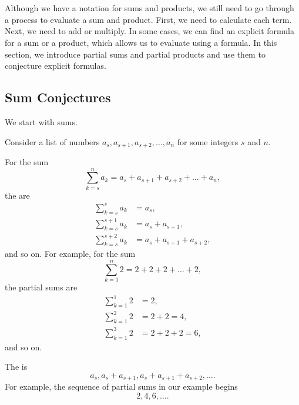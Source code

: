 \section{\secsumconj}
\label{sec_sum_conj}

Although we have a notation for sums and products, we still need to go through a process to evaluate a sum and product.  First, we need to calculate each term.  Next, we need to add or multiply.  In some cases, we can find an explicit formula for a sum or a product, which allows us to evaluate using a formula. In this section, we introduce partial sums and partial products and use them to conjecture explicit formulas.


\newcommand{\subsumconj}{Sum Conjectures}
\subsection{\subsumconj}
\label{sub_sum_conj}

We start with sums.  

\begin{defn}
\label{defn_partial_sum}
    Consider a list of numbers $a_s, a_{s+1}, a_{s+2}, \ldots, a_n$ for some integers $s$ and $n$. 
        \begin{apart}
            \item For the sum  
                $$\sum_{k=s}^n a_k =a_s + a_{s+1}+a_{s+2}+\ldots+a_n,$$
            the  are 
                \begin{align*}
                    \sum_{k=s}^s a_k & =a_s, \\
                    \sum_{k=s}^{s+1} a_k & =a_s+a_{s+1}, \\
                    \sum_{k=s}^{s+2} a_k & =a_s+a_{s+1}+a_{s+2},
                \end{align*}
            and so on.  For example, for the sum   
                $$\sum_{k=1}^n 2 =2 + 2 + 2 + \ldots + 2,$$
            the partial sums are  
                \begin{align*}
                    \sum_{k=1}^1 2 &=2, \\
                    \sum_{k=1}^2 2 &=2+2=4,\\
                    \sum_{k=1}^3 2 &=2+2+2=6,
                \end{align*}
            and so on.
            \item The  is 
                $$a_s, a_s+a_{s+1},a_s+a_{s+1}+a_{s+2}, \ldots.$$
            For example, the sequence of partial sums in our example begins $$2, 4, 6, \ldots.$$
        \end{apart}
\end{defn}

